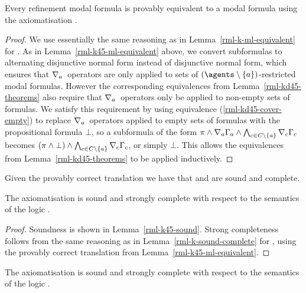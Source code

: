 \begin{lemma}\label{rml-kd45-ml-equivalent}
Every refinement modal formula is provably equivalent to a modal formula using the axiomatisation \axiomRmlKFF{}.
\end{lemma}

\begin{proof}
We use essentially the same reasoning as in Lemma~\ref{rml-k-ml-equivalent} for \axiomRmlK{}.
As in Lemma~\ref{rml-k45-ml-equivalent} above, we convert subformulas to alternating disjunctive normal form instead of disjunctive normal form, which ensures that $\nabla_{a}$~operators are only applied to sets of $(\agents \setminus \{\agentA\})$-restricted modal formulas.
However the corresponding equivalences from Lemma~\ref{rml-kd45-theorems} also require that $\nabla_{a}$~operators only be applied to non-empty sets of formulas.
We satisfy this requirement by using equivalence (\ref{rml-kd45-cover-empty}) to replace $\nabla_{a}$~operators applied to empty sets of formulas with the propositional formula $\bot$, so a subformula of the form $\pi \land \nabla_{a} \Gamma_a \land \bigwedge_{c \in C \setminus \{a\}} \nabla_{c} \Gamma_c$ becomes $(\pi \land \bot) \land \bigwedge_{c \in C \setminus \{a\}} \nabla_{c} \Gamma_c$, or simply $\bot$.
This allows the equivalences from Lemma~\ref{rml-kd45-theorems} to be applied inductively.
\end{proof}

Given the provably correct translation we have that \axiomRmlKFF{} and \axiomRmlKD{} are sound and complete.

\begin{theorem}\label{rml-k45-sound-complete}
The axiomatisation \axiomRmlKFF{} is sound and strongly complete with respect to the semantics of the logic \logicRmlKFF{}.
\end{theorem}

\begin{proof}
Soundness is shown in Lemma~\ref{rml-k45-sound}.
Strong completeness follows from the same reasoning as in Lemma~\ref{rml-k-sound-complete} for \axiomRmlK{}, using the provably correct translation from Lemma~\ref{rml-k45-ml-equivalent}.
\end{proof}

\begin{theorem}\label{rml-kd45-sound-complete}
The axiomatisation \axiomRmlKFF{} is sound and strongly complete with respect to the semantics of the logic \logicRmlKD{}.
\end{theorem}

